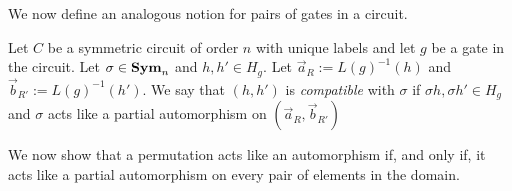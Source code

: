 \documentclass[../paper.tex]{subfiles}
\begin{document}
We now define an analogous notion for pairs of gates in a circuit.

\begin{definition}
  Let $C$ be a symmetric circuit of order $n$ with unique labels and let $g$ be
  a gate in the circuit. Let $\sigma \in \text{\textbf{Sym}}_n$ and $h, h' \in H_g$. Let
  $\vec{a}_R:= L(g)^{-1}(h)$ and $\vec{b}_{R'} := L(g)^{-1}(h')$. We say that
  $(h, h')$ is \emph{compatible} with $\sigma$ if $\sigma h, \sigma h' \in H_g$
  and $\sigma$ acts like a partial automorphism on $(\vec{a}_R, \vec{b}_{R'})$
\end{definition}
  



We now show that a permutation acts like an automorphism if, and only if, it
acts like a partial automorphism on every pair of elements in the domain.
\end{document}
